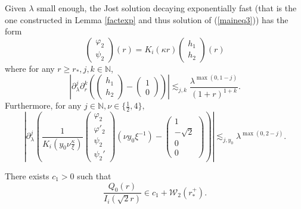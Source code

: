 \documentclass[10pt,a4paper]{amsart}
\begin{document}
\begin{lem}
  \label{alegant} Given $\lambda$ small enough, the Jost solution decaying exponentially fast (that is the one constructed in Lemma \ref{factexp} and thus solution of (\ref{maineq3})) has the form
  \[ \left(\begin{array}{c}
       \varphi_2\\
       \psi_2
     \end{array}\right) (r) = K_i (\kappa r) \left(\begin{array}{c}
       h_1\\
       h_2
     \end{array}\right) (r) \]
  where for any $r \geqslant r_\ast, j, k \in \mathbb{N}$,
  \[ \left| \partial_{\lambda}^j \partial_r^k \left( \left(\begin{array}{c}
       h_1\\
       h_2
     \end{array}\right) - \left(\begin{array}{c}
       1\\
       0
     \end{array}\right) \right) \right| \lesssim_{j, k} \frac{\lambda^{\max
     (0, 1 - j)}}{(1 + r)^{1 + k}} . \]
  Furthermore, for any $j \in \mathbb{N}, \nu \in \{ \frac 12, 4 \},$
  \[ \left| \partial_{\lambda}^j \left( \frac{1}{K_i \left( y_0\nu
     \frac{\kappa}{\xi} \right)} \left(\begin{array}{c}
       \varphi_2\\
       \varphi'_2\\
       \psi_2\\
       \psi_2'
     \end{array}\right) (\nu y_0 \xi^{- 1}) - \left(\begin{array}{c}
       1\\
       - \sqrt{2}\\
       0\\
       0
     \end{array}\right) \right) \right| \lesssim_{j,y_0} \lambda^{\max (0, 2 - j)} .
  \]
\end{lem}

\begin{lem}
  \label{heimat}There exists $c_1 > 0$ such that
  \[ \frac{Q_0 (r)}{I_i \left( \sqrt{2} r \right)} \in c_1 +\mathcal{W}_2
     (r_\ast^+) . \]
\end{lem}
\end{document}
